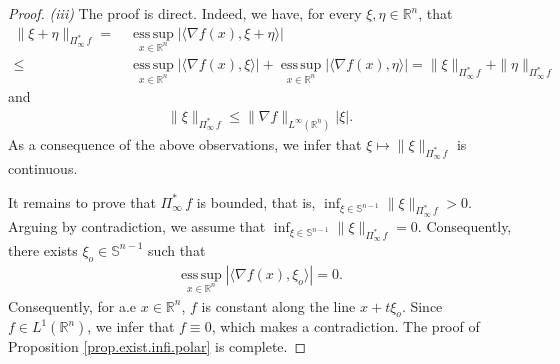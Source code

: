 \documentclass[10pt,a4paper]{amsart}
\newcommand{\R}{\mathbb{R}}
\newcommand{\Sphere}{\mathbb{S}^{n - 1}}
\newcommand{\esssup}{\operatorname*{ess\,sup}}
\begin{document}
\begin{proof}
 	\medskip
 	
 	\textit{(iii)}
 	 The proof is direct.
 	 Indeed, we have, for every $\xi, \eta \in \R^n$, that
 	 \begin{align*}
 	 	\| \xi + \eta \|_{\Pi^\ast_\infty \, f} = & ~
        \esssup_{x \in \R^n} | \langle \nabla f(x), \xi + \eta \rangle| \\
        \leq & ~ \esssup_{x \in \R^n} | \langle \nabla f(x), \xi \rangle | + \esssup_{x \in \R^n} |\langle \nabla f(x), \eta \rangle| = \| \xi \|_{\Pi^\ast_\infty \, f} + \| \eta \|_{\Pi^\ast_\infty \, f}
 	 \end{align*}
 	 and
 	 \begin{align*}
 	 	\| \xi \|_{\Pi^\ast_\infty \, f } \leq \| \nabla f \|_{L^\infty(\R^n)} |\xi|.
 	 \end{align*}
 	 As a consequence of the above observations, we infer that $\xi \mapsto \| \xi \|_{\Pi^\ast_\infty \, f}$ is continuous.

        \medskip

        It remains to prove that $\Pi^\ast_\infty \, f$ is bounded, that is, $\textstyle\inf_{\xi \in \Sphere} \| \xi \|_{\Pi^\ast_\infty \, f} > 0$.
        Arguing by contradiction, we assume that $\textstyle\inf_{\xi \in \Sphere} \| \xi \|_{\Pi^\ast_\infty \, f} = 0$.
        Consequently, there exists $\xi_o \in \Sphere$ such that 
            \begin{align*}
                \esssup_{x \in \R^n} | \langle \nabla f(x), \xi_o \rangle | = 0.
            \end{align*}
Consequently, for a.e $x \in \R^n$, $f$ is constant along the line $x + t\xi_o$.
        Since $f \in L^1(\R^n)$, we infer that $f \equiv 0$, which makes a contradiction.
 	The proof of Proposition \ref{prop.exist.infi.polar} is complete.
\end{proof}
\end{document}
